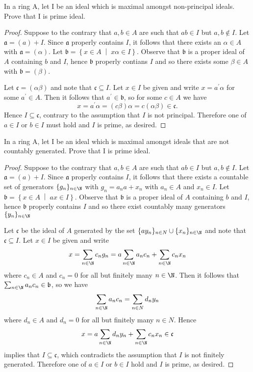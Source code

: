 \documentclass[10pt]{amsart}
\begin{document}
\begin{thm}
	In a ring A, let I be an ideal which is maximal amongst non-principal ideals. 
	Prove that I is prime ideal.

	\begin{proof}
		Suppose to the contrary that $a, b \in A$ are such that $ab \in I$ but $a,b \not \in I$.
		Let $\mathfrak{a} = (a) + I$.
		Since $\mathfrak{a}$ properly contains $I$, it follows that there exists an $\alpha \in A$ with $\mathfrak{a} = (\alpha)$.
		Let $\mathfrak{b} = \left\{x \in A \;\middle\vert\; x\alpha \in I\right\}$.
		Observe that $\mathfrak{b}$ is a proper ideal of $A$ containing $b$ and $I$, hence $\mathfrak{b}$ properly contians $I$ and so there exists some $\beta \in A$ with $\mathfrak{b} = (\beta)$.

		Let $\mathfrak{c} = (\alpha \beta)$  and note that $\mathfrak{c} \subseteq I$.
		Let $x \in I$ be given and write $x = a^\prime \alpha$ for some $a^\prime \in A$.
		Then it follows that $a^\prime \in \mathfrak{b}$, so for some $c \in A$ we have 
		$$x = a^\prime \alpha = (c\beta)\alpha = c(\alpha \beta) \in \mathfrak{c}.$$
		Hence $I \subseteq \mathfrak{c}$, contrary to the assumption that $I$ is not principal.
		Therefore one of $a \in I$ or $b \in I$ must hold and $I$ is prime, as desired.
	\end{proof}
\end{thm}

\begin{thm}
	In a ring A, let I be an ideal which is maximal amongst ideals that are not countably generated. 
	Prove that I is prime ideal.

\begin{proof}
	Suppose to the contrary that $a, b \in A$ are such that $ab \in I$ but $a,b \not \in I$.
	Let $\mathfrak{a} = (a) + I$.
	Since $\mathfrak{a}$ properly contains $I$, it follows that there exists a countable set of generators $\{g_n\}_{n \in \N}$ with $g_n = a_n a + x_n$ with $a_n \in A$ and $x_n \in I$.
	Let $\mathfrak{b} = \left\{x \in A \;\middle\vert\; ax \in I\right\}$.
	Observe that $\mathfrak{b}$ is a proper ideal of $A$ containing $b$ and $I$, hence $\mathfrak{b}$ properly contains $I$ and so there exist countably many generators $\{y_n\}_{n \in \N}$

	Let $\mathfrak{c}$ be the ideal of $A$ generated by the set $\{ay_n\}_{n \in N} \cup \{x_n\}_{n \in \N}$ and note that $\mathfrak{c} \subseteq I$.
	Let $x \in I$ be given and write 
	$$x = \sum_{n \in \N} c_ng_n = a\sum_{n \in \N}a_nc_n + \sum_{n \in \N}c_n x_n$$
	where $c_n \in A$ and $c_n = 0$ for all but finitely many $n \in \N$.
	Then it follows that $\sum_{n \in \N} a_n c_n \in \mathfrak{b}$, so we have
	$$\sum_{n \in \N} a_n c_n = \sum_{n \in N} d_n y_n$$
	where $d_n \in A$ and $d_n = 0$ for all but finitely many $n \in N$.
	Hence
	$$x =  a\sum_{n \in \N}d_n y_n + \sum_{n \in \N}c_n x_n \in \mathfrak{c}$$
	implies that $I \subseteq \mathfrak{c}$, which contradicts the assumption that $I$ is not finitely generated.
	Therefore one of $a \in I$ or $b \in I$ hold and $I$ is prime, as desired.
\end{proof}
\end{thm}
\end{document}

